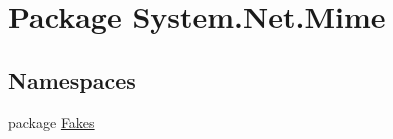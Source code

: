 \hypertarget{namespace_system_1_1_net_1_1_mime}{\section{Package System.\-Net.\-Mime}
\label{namespace_system_1_1_net_1_1_mime}
}
\subsection*{Namespaces}
\begin{DoxyCompactItemize}
\item 
package \hyperlink{namespace_system_1_1_net_1_1_mime_1_1_fakes}{Fakes}
\end{DoxyCompactItemize}
